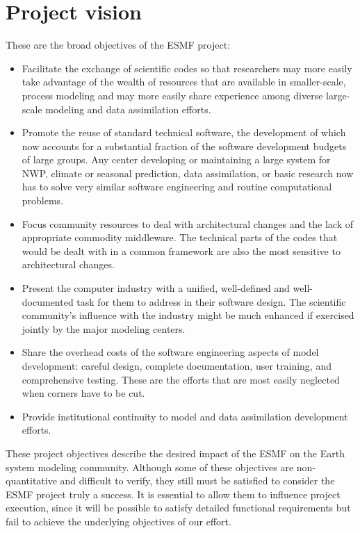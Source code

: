 \section{Project vision}

These are the broad objectives of the ESMF project:

\begin{itemize}
  
\item Facilitate the exchange of scientific codes so that researchers
  may more easily take advantage of the wealth of resources that are
  available in smaller-scale, process modeling and may more easily
  share experience among diverse large-scale modeling and data
  assimilation efforts.
  
\item Promote the reuse of standard technical software, the
  development of which now accounts for a substantial fraction of the
  software development budgets of large groups.  Any center developing
  or maintaining a large system for NWP, climate or seasonal
  prediction, data assimilation, or basic research now has to solve
  very similar software engineering and routine computational
  problems.
  
\item Focus community resources to deal with architectural changes and
  the lack of appropriate commodity middleware. The technical parts of
  the codes that would be dealt with in a common framework are also
  the most sensitive to architectural changes.
  
\item Present the computer industry with a unified, well-defined and
  well-documented task for them to address in their software design.
  The scientific community's influence with the industry might be much
  enhanced if exercised jointly by the major modeling centers.
  
\item Share the overhead costs of the software engineering aspects of
  model development: careful design, complete documentation, user
  training, and comprehensive testing. These are the efforts that are
  most easily neglected when corners have to be cut.
  
\item Provide institutional continuity to model and data assimilation
  development efforts.

\end{itemize}

These project objectives describe the desired impact of the ESMF on
the Earth system modeling community.  Although some of these
objectives are non-quantitative and difficult to verify, they still
must be satisfied to consider the ESMF project truly a success.  It is
essential to allow them to influence project execution, since it will
be possible to satisfy detailed functional requirements but fail to
achieve the underlying objectives of our effort.





